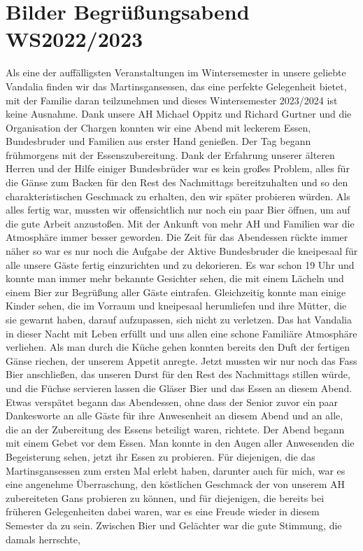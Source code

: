 \section{Bilder Begrüßungsabend WS2022/2023}



\begin{multicols}{2}
Als eine der auffälligsten Veranstaltungen im Wintersemester in unsere geliebte Vandalia finden wir das Martinsgansessen, das eine perfekte Gelegenheit bietet, mit der Familie daran teilzunehmen und dieses Wintersemester 2023/2024 ist keine Ausnahme. Dank unsere AH Michael Oppitz und Richard Gurtner und die Organisation der Chargen konnten wir eine Abend mit leckerem Essen, Bundesbruder und Familien aus erster Hand genießen. Der Tag begann frühmorgens mit der Essenszubereitung. Dank der Erfahrung unserer älteren Herren und der Hilfe einiger Bundesbrüder war es kein großes Problem, alles für die Gänse zum Backen für den Rest des Nachmittags bereitzuhalten und so den charakteristischen Geschmack zu erhalten, den wir später probieren würden. Als alles fertig war, mussten wir offensichtlich nur noch ein paar Bier öffnen, um auf die gute Arbeit anzustoßen. Mit der Ankunft von mehr AH und Familien war die Atmosphäre immer besser geworden. Die Zeit für das Abendessen rückte immer näher so war es nur noch die Aufgabe der Aktive Bundesbruder die kneipesaal für alle unsere Gäste fertig einzurichten und zu dekorieren. Es war schon 19 Uhr und konnte man immer mehr bekannte Gesichter sehen, die mit einem Lächeln und einem Bier zur Begrüßung aller Gäste eintrafen. Gleichzeitig konnte man einige Kinder sehen, die im Vorraum und kneipesaal herumliefen und ihre Mütter, die sie gewarnt haben, darauf aufzupassen, sich nicht zu verletzen. Das hat Vandalia in dieser Nacht mit Leben erfüllt und uns allen eine schone Familiäre Atmosphäre verliehen. Als man durch die Küche gehen konnten bereits den Duft der fertigen Gänse riechen, der unserem Appetit anregte. Jetzt mussten wir nur noch das Fass Bier anschließen, das unseren Durst für den Rest des Nachmittags stillen würde, und die Füchse servieren lassen die Gläser Bier und das Essen an diesem Abend. Etwas verspätet begann das Abendessen, ohne dass der Senior zuvor ein paar Dankesworte an alle Gäste für ihre Anwesenheit an diesem Abend und an alle, die an der Zubereitung des Essens beteiligt waren, richtete. Der Abend begann mit einem Gebet vor dem Essen. Man konnte in den Augen aller Anwesenden die Begeisterung sehen, jetzt ihr Essen zu probieren. Für diejenigen, die das Martinsgansessen zum ersten Mal erlebt haben, darunter auch für mich, war es eine angenehme Überraschung, den köstlichen Geschmack der von unserem AH zubereiteten Gans probieren zu können, und für diejenigen, die bereits bei früheren Gelegenheiten dabei waren, war es eine Freude wieder in diesem Semester da zu sein. Zwischen Bier und Gelächter war die gute Stimmung, die damals herrschte, 
\end{multicols}
